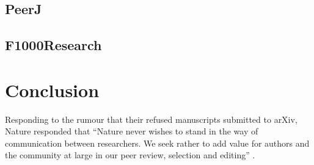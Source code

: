 \documentclass[letterpaper,twocolumn,superscriptaddress,showkeys]{revtex4}
\begin{document}
\subsection{PeerJ}


\subsection{F1000Research}


\section{Conclusion}


Responding to the rumour that their refused manuscripts submitted to arXiv,
Nature responded that ``Nature never wishes to stand in the way of communication
between researchers. We seek rather to add value for authors and the community
at large in our peer review, selection and editing'' \cite{nat05}.

\newpage


\end{document}
